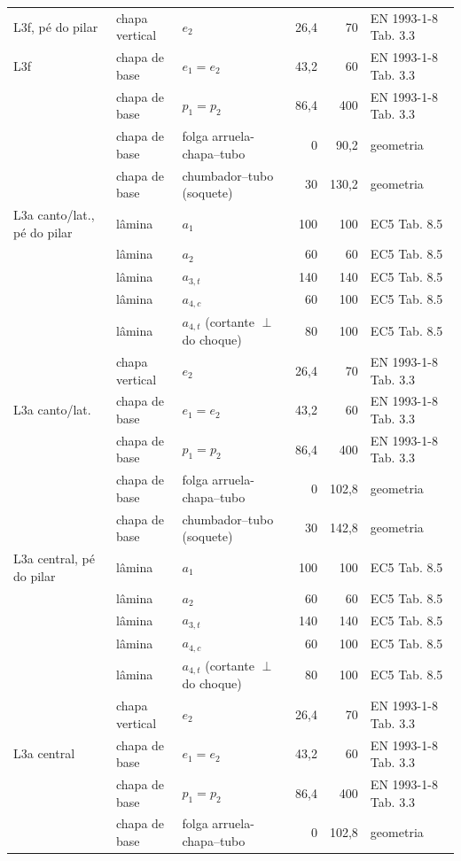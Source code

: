 {\begin{tabular}{@{}lllrrl@{}}
    L3f, pé do pilar & chapa vertical & $e_2$ & 26,4 & 70 & EN 1993-1-8 Tab. 3.3 \\
    L3f & chapa de base & $e_1 = e_2$ & 43,2 & 60 & EN 1993-1-8 Tab. 3.3 \\
     & chapa de base & $p_1 = p_2$ & 86,4 & 400 & EN 1993-1-8 Tab. 3.3 \\
     & chapa de base & folga arruela-chapa–tubo & 0 & 90,2 & geometria \\
     & chapa de base & chumbador–tubo (soquete) & 30 & 130,2 & geometria \\
    L3a canto/lat., pé do pilar & lâmina & $a_1$ & 100 & 100 & EC5 Tab. 8.5 \\
     & lâmina & $a_2$ & 60 & 60 & EC5 Tab. 8.5 \\
     & lâmina & $a_{3,t}$ & 140 & 140 & EC5 Tab. 8.5 \\
     & lâmina & $a_{4,c}$ & 60 & 100 & EC5 Tab. 8.5 \\
     & lâmina & $a_{4,t}$ (cortante $\perp$ do choque) & 80 & 100 & EC5 Tab. 8.5 \\
     & chapa vertical & $e_2$ & 26,4 & 70 & EN 1993-1-8 Tab. 3.3 \\
    L3a canto/lat. & chapa de base & $e_1 = e_2$ & 43,2 & 60 & EN 1993-1-8 Tab. 3.3 \\
     & chapa de base & $p_1 = p_2$ & 86,4 & 400 & EN 1993-1-8 Tab. 3.3 \\
     & chapa de base & folga arruela-chapa–tubo & 0 & 102,8 & geometria \\
     & chapa de base & chumbador–tubo (soquete) & 30 & 142,8 & geometria \\
    L3a central, pé do pilar & lâmina & $a_1$ & 100 & 100 & EC5 Tab. 8.5 \\
     & lâmina & $a_2$ & 60 & 60 & EC5 Tab. 8.5 \\
     & lâmina & $a_{3,t}$ & 140 & 140 & EC5 Tab. 8.5 \\
     & lâmina & $a_{4,c}$ & 60 & 100 & EC5 Tab. 8.5 \\
     & lâmina & $a_{4,t}$ (cortante $\perp$ do choque) & 80 & 100 & EC5 Tab. 8.5 \\
     & chapa vertical & $e_2$ & 26,4 & 70 & EN 1993-1-8 Tab. 3.3 \\
    L3a central & chapa de base & $e_1 = e_2$ & 43,2 & 60 & EN 1993-1-8 Tab. 3.3 \\
     & chapa de base & $p_1 = p_2$ & 86,4 & 400 & EN 1993-1-8 Tab. 3.3 \\
     & chapa de base & folga arruela-chapa–tubo & 0 & 102,8 & geometria \\

\end{tabular}}
